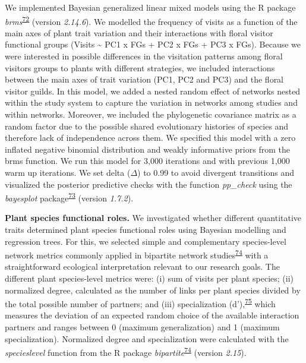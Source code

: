 \documentclass[
  12pt,
  a4paper,
]{article}
\begin{document}
We implemented Bayesian generalized linear mixed models using the R package \emph{brms}\textsuperscript{\protect\hyperlink{ref-burkner2017}{72}} (version \emph{2.14.6}). We modelled the frequency of visits as a function of the main axes of plant trait variation and their interactions with floral visitor functional groups (Visits \textasciitilde{} PC1 x FGs + PC2 x FGs + PC3 x FGs). Because we were interested in possible differences in the visitation patterns among floral visitors groups to plants with different strategies, we included interactions between the main axes of trait variation (PC1, PC2 and PC3) and the floral visitor guilds. In this model, we added a nested random effect of networks nested within the study system to capture the variation in networks among studies and within networks. Moreover, we included the phylogenetic covariance matrix as a random factor due to the possible shared evolutionary histories of species and therefore lack of independence across them. We specified this model with a zero inflated negative binomial distribution and weakly informative priors from the brms function. We run this model for 3,000 iterations and with previous 1,000 warm up iterations. We set delta (\(\Delta\)) to 0.99 to avoid divergent transitions and visualized the posterior predictive checks with the function \emph{pp\_check} using the \emph{bayesplot} package\textsuperscript{\protect\hyperlink{ref-gabry2019}{73}} (version \emph{1.7.2}).

\textbf{Plant species functional roles.} We investigated whether different quantitative traits determined plant species functional roles using Bayesian modelling and regression trees. For this, we selected simple and complementary species-level network metrics commonly applied in bipartite network studies\textsuperscript{\protect\hyperlink{ref-dormann2008}{74}} with a straightforward ecological interpretation relevant to our research goals. The different plant species-level metrics were: (i) sum of visits per plant species; (ii) normalized degree, calculated as the number of links per plant species divided by the total possible number of partners; and (iii) specialization (d'),\textsuperscript{\protect\hyperlink{ref-bluthgen2006}{75}} which measures the deviation of an expected random choice of the available interaction partners and ranges between 0 (maximum generalization) and 1 (maximum specialization). Normalized degree and specialization were calculated with the \emph{specieslevel} function from the R package \emph{bipartite}\textsuperscript{\protect\hyperlink{ref-dormann2008}{74}} (version \emph{2.15}).
\end{document}
